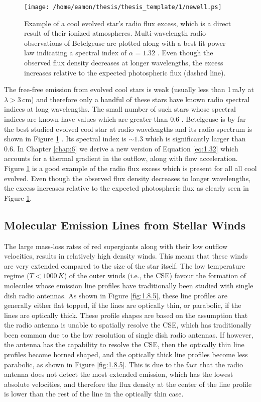 \begin{figure}[hbt!]
\centering 
          \texttt{[image: /home/eamon/thesis/thesis\_template/1/newell.ps]}
\caption[Radio spectral index for Betelgeuse]{Example of a cool evolved star's radio flux excess, which is a direct result of their ionized atmospheres. Multi-wavelength radio observations of Betelgeuse are plotted along with a best fit power law indicating a spectral index of $\alpha = 1.32$ \citep{newell_1982}.  Even though the observed flux density decreases at longer wavelengths, the excess increases relative to the expected photospheric flux (dashed line).}
\label{fig:1.5.5}
\end{figure}

The free-free emission from evolved cool stars is weak (usually less than 1\,mJy at $\lambda > 3$\,cm) and therefore only a handful of these stars have known radio spectral indices at long wavelengths. The small number of such stars whose spectral indices are known have values which are greater than 0.6 \citep[e.g.][]{drake_1986}. Betelgeuse is by far the best studied evolved cool star at radio wavelengths and its radio spectrum is shown in Figure \ref{fig:1.5.5} \citep{newell_1982}. Its spectral index is $\sim 1.3$ which is significantly larger than 0.6. In Chapter \ref{chap:6} we derive a new version of Equation \ref{eq:1.32} which accounts for a thermal gradient in the outflow, along with flow acceleration. Figure \ref{fig:1.5.5} is a good example of the radio flux excess which is present for all all cool evolved. Even though the observed flux density decreases to longer wavelengths, the excess increases relative to the expected photospheric flux as clearly seen in Figure \ref{fig:1.5.5}.

\subsection{Molecular Emission Lines from Stellar Winds}\label{sec:1.8.5}
The large mass-loss rates of red supergiants along with their low outflow velocities, results in relatively high density winds. This means that these winds are very extended compared to the size of the star itself. The low temperature regime ($T< 1000\,K$) of the outer winds (i.e., the CSE) favour the formation of molecules whose emission line profiles have traditionally been studied with single dish radio antennas. As shown in Figure \ref{fig:1.8.5}, these line profiles are generally either flat topped, if the lines are optically thin, or parabolic, if the lines are optically thick. These profile shapes are based on the assumption that the radio antenna is unable to spatially resolve the CSE, which has traditionally been common due to the low resolution of single dish radio antennas. If however, the antenna has the capability to resolve the CSE, then the optically thin line profiles become horned shaped, and the optically thick line profiles become less parabolic, as shown in Figure \ref{fig:1.8.5}. This is due to the fact that the radio antenna does not detect the most extended emission, which has the lowest absolute velocities, and therefore the flux density at the center of the line profile is lower than the rest of the line in the optically thin case.

